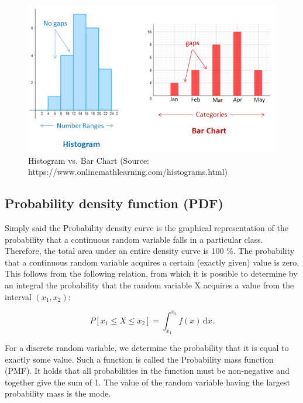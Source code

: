 \documentclass[a4paper,10pt,twoside]{article}
\begin{document}
\vspace{0.3cm}
\begin{figure}[hbt!]
\begin{center}
\includegraphics[width=12cm]{../pictures/histogram_barchart.png}
\caption[Histogram vs. Bar Chart (boxplot)]{Histogram vs. Bar Chart (Source: https://www.onlinemathlearning.com/histograms.html)}
\label{fig:histogram_barchart}
\end{center}
\end{figure}

\subsection{Probability density function (PDF)}

Simply said the Probability density curve is the graphical representation of the probability that a continuous random variable falls in a particular class. Therefore, the total area under an entire density curve is 100 \%. The probability that a continuous random variable acquires a certain (exactly given) value is zero. This follows from the following relation, from which it is possible to determine by an integral the probability that the random variable X acquires a value from the interval $ (x_1, x_2) $:

$$
P[x_1 \leq X \leq x_2] = \int_{x_1}^{x_2} f(x)\, \mathrm{d}x.
$$

\noindent For a discrete random variable, we determine the probability that it is equal to exactly some value. Such a function is called the Probability mass function (PMF). It holds that all probabilities in the function must be non-negative and together give the sum of 1. The value of the random variable having the largest probability mass is the mode.

\newpage
\vspace*{-1cm}
\end{document}
